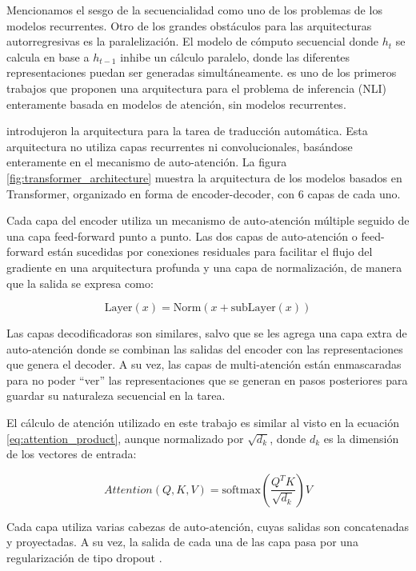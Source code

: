 Mencionamos el sesgo de la secuencialidad como uno de los problemas de los modelos recurrentes. Otro de los grandes obstáculos para las arquitecturas autorregresivas es la paralelización. El modelo de cómputo secuencial donde $h_t$ se calcula en base a $h_{t-1}$ inhibe un cálculo paralelo, donde las diferentes representaciones puedan ser generadas simultáneamente. \citet{parikh-etal-2016-decomposable} es uno de los primeros trabajos que proponen una arquitectura para el problema de inferencia (NLI) enteramente basada en modelos de atención, sin modelos recurrentes.

\citet{vaswani2017attention} introdujeron la arquitectura  para la tarea de traducción automática. Esta arquitectura no utiliza capas recurrentes ni convolucionales, basándose enteramente en el mecanismo de auto-atención. La figura \ref{fig:transformer_architecture} muestra la arquitectura de los modelos basados en Transformer, organizado en forma de encoder-decoder, con 6 capas de cada uno.

Cada capa del encoder utiliza un mecanismo de auto-atención múltiple seguido de una capa feed-forward punto a punto. Las dos capas de auto-atención o feed-forward están sucedidas por conexiones residuales \cite{he2016deep} para facilitar el flujo del gradiente en una arquitectura profunda y una capa de normalización, de manera que la salida se expresa como:

\begin{equation*}
    \text{Layer}(x) = \text{Norm}(x + \text{subLayer}(x))
\end{equation*}

Las capas decodificadoras son similares, salvo que se les agrega una capa extra de auto-atención donde se combinan las salidas del encoder con las representaciones que genera el decoder. A su vez, las capas de multi-atención están enmascaradas para no poder ``ver'' las representaciones que se generan en pasos posteriores para guardar su naturaleza secuencial en la tarea.

El cálculo de atención utilizado en este trabajo es similar al visto en la ecuación \ref{eq:attention_product}, aunque normalizado por $\sqrt{d_k}$, donde $d_k$ es la dimensión de los vectores de entrada:

\begin{equation*}
    Attention(Q, K, V) = \text{softmax}(\frac{Q^T K}{\sqrt{d_k}}) V
\end{equation*}

Cada capa utiliza varias cabezas de auto-atención, cuyas salidas son concatenadas y proyectadas. A su vez, la salida de cada una de las capa pasa por una regularización de tipo dropout \cite{srivastava2014dropout}.

